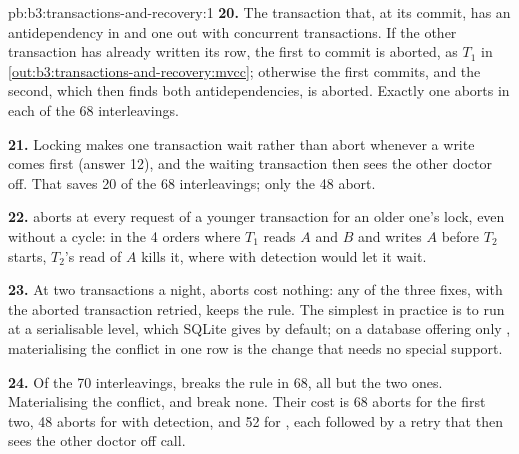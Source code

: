 \begin{solution}{pb:b3:transactions-and-recovery:1}
\textbf{20.} The transaction that, at its commit, has an antidependency in and one out with concurrent transactions. If the other transaction has already written its row, the first to commit is aborted, as $T_1$ in \cref{out:b3:transactions-and-recovery:mvcc}; otherwise the first commits, and the second, which then finds both antidependencies, is aborted. Exactly one aborts in each of the 68 interleavings.

\textbf{21.} Locking makes one transaction wait rather than abort whenever a write comes first (answer 12), and the waiting transaction then sees the other doctor off. That saves 20 of the 68  interleavings; only the 48  abort.

\textbf{22.}  aborts at every request of a younger transaction for an older one's lock, even without a cycle: in the 4 orders where $T_1$ reads $A$ and $B$ and writes $A$ before $T_2$ starts, $T_2$'s read of $A$ kills it, where  with detection would let it wait.

\textbf{23.} At two transactions a night, aborts cost nothing: any of the three fixes, with the aborted transaction retried, keeps the rule. The simplest in practice is to run at a serialisable level, which SQLite gives by default; on a database offering only , materialising the conflict in one row is the change that needs no special support.

\textbf{24.} Of the 70 interleavings,  breaks the rule in 68, all but the two  ones. Materialising the conflict,  and  break none. Their cost is 68 aborts for the first two, 48  aborts for  with detection, and 52 for , each followed by a retry that then sees the other doctor off call.
\end{solution}
